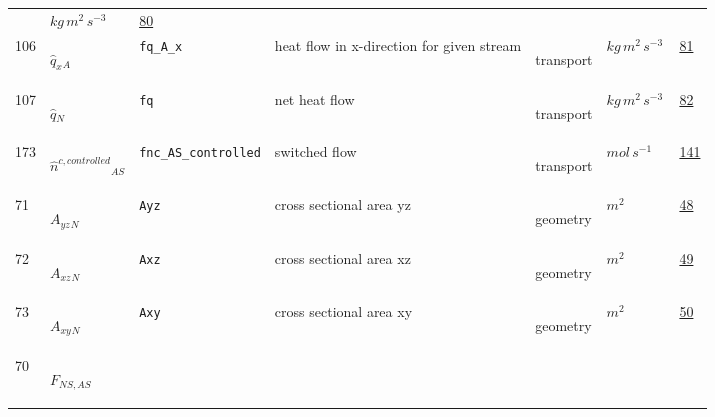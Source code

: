 \begin{longtable}{|p{1cm}|p{2.5cm}|p{4.5cm}|p{8cm}|p{3.0cm}|p{3cm}|p{1cm}|}
             & $ kg \,m^{2} \,s^{-3} \, $
             & \hyperlink{"e:80"}{ 80 }
                 \\
    106
             & \hypertarget{"v:106"}{ $ {{\hat{q}_{x}}}{_{A}} $}
             & \verb|fq_A_x|
             & heat flow in x-direction for given stream
             & \begin{lay}transport \end{lay}
             & $ kg \,m^{2} \,s^{-3} \, $
             & \hyperlink{"e:81"}{ 81 }
                 \\
    107
             & \hypertarget{"v:107"}{ $ {{\hat{q}}}{_{N}} $}
             & \verb|fq|
             & net heat flow
             & \begin{lay}transport \end{lay}
             & $ kg \,m^{2} \,s^{-3} \, $
             & \hyperlink{"e:82"}{ 82 }
                 \\
    173
             & \hypertarget{"v:173"}{ $ {\hat{n}^{c,controlled}}{_{{A S}}} $}
             & \verb|fnc_AS_controlled|
             & switched flow
             & \begin{lay}transport \end{lay}
             & $ mol \,s^{-1} \, $
             & \hyperlink{"e:141"}{ 141 }
                 \\
    71
             & \hypertarget{"v:71"}{ $ {{A_{yz}}}{_{N}} $}
             & \verb|Ayz|
             & cross sectional area yz
             & \begin{lay}geometry \end{lay}
             & $ m^{2} \, $
             & \hyperlink{"e:48"}{ 48 }
                 \\
    72
             & \hypertarget{"v:72"}{ $ {{A_{xz}}}{_{N}} $}
             & \verb|Axz|
             & cross sectional area xz
             & \begin{lay}geometry \end{lay}
             & $ m^{2} \, $
             & \hyperlink{"e:49"}{ 49 }
                 \\
    73
             & \hypertarget{"v:73"}{ $ {{A_{xy}}}{_{N}} $}
             & \verb|Axy|
             & cross sectional area xy
             & \begin{lay}geometry \end{lay}
             & $ m^{2} \, $
             & \hyperlink{"e:50"}{ 50 }
                 \\
    70
             & \hypertarget{"v:70"}{ $ {F}{_{{N S}, {A S}}} $}

\end{longtable}
